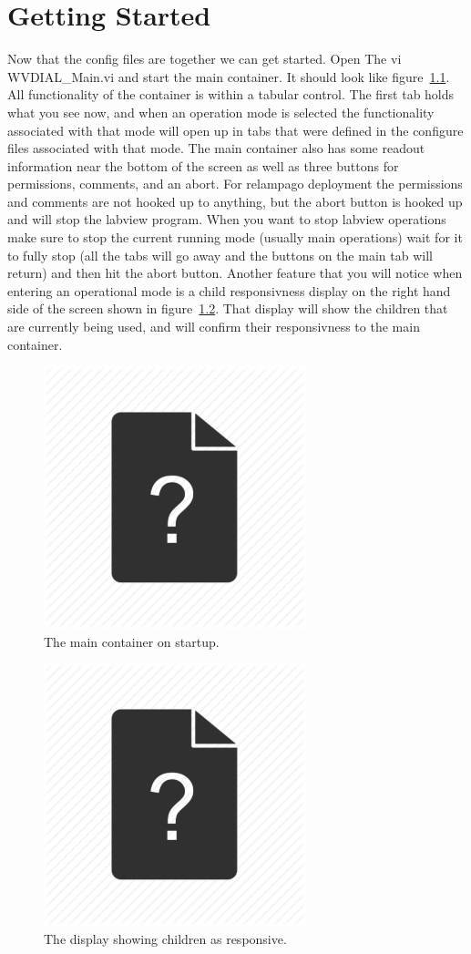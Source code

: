 
\chapter{Getting Started}
\label{CH-GettingStarted}

Now that the config files are together we can get started. Open The vi WVDIAL\_Main.vi and start the main container. It should look like figure~\ref{Fig-StartupContainer}. All functionality of the container is within a tabular control. The first tab holds what you see now, and when an operation mode is selected the functionality associated with that mode will open up in tabs that were defined in the configure files associated with that mode. The main container also has some readout information near the bottom of the screen as well as three buttons for permissions, comments, and an abort. For relampago deployment the permissions and comments are not hooked up to anything, but the abort button is hooked up and will stop the labview program. When you want to stop labview operations make sure to stop the current running mode (usually main operations) wait for it to fully stop (all the tabs will go away and the buttons on the main tab will return) and then hit the abort button. Another feature that you will notice when entering an operational mode is a child responsivness display on the right hand side of the screen shown in figure~\ref{Fig-Responsive}. That display will show the children that are currently being used, and will confirm their responsivness to the main container. 

\begin{figure}[!ht]\centering
\includegraphics[height=3in]{Figures/QMark}
\caption{The main container on startup.}
\label{Fig-StartupContainer}
\end{figure}

\begin{figure}[!ht]\centering
\includegraphics[height=3in]{Figures/QMark}
\caption{The display showing children as responsive.}
\label{Fig-Responsive}
\end{figure}

\newpage 
